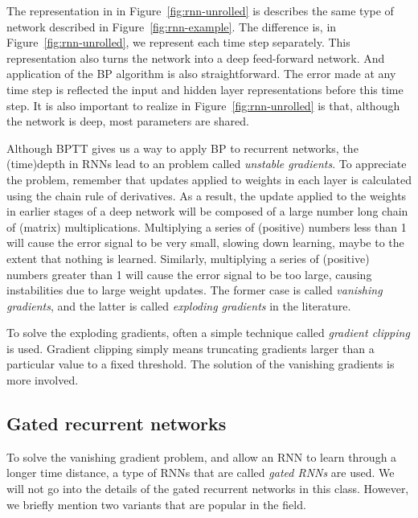 The representation in in Figure~\ref{fig:rnn-unrolled} is describes the
same type of network described in Figure~\ref{fig:rnn-example}.
The difference is, in Figure~\ref{fig:rnn-unrolled},
we represent each time step separately.
This representation also turns the network into a deep feed-forward network.
And application of the BP algorithm is also straightforward.
The error made at any time step is reflected the input and
hidden layer representations before this time step.
It is also important to realize in Figure~\ref{fig:rnn-unrolled} is that,
although the network is deep, most parameters are shared.

Although BPTT gives us a way to apply BP to recurrent networks,
the (time)depth in RNNs lead to an problem called \emph{unstable gradients}.
To appreciate the problem,
remember that updates applied to weights in each layer is 
calculated using the chain rule of derivatives.
As a result, 
the update applied to the weights in earlier stages of a deep network
will be composed of a large number long chain of (matrix) multiplications.
Multiplying a series of (positive) numbers less than \num{1}
will cause the error signal to be very small,
slowing down learning, maybe to the extent that nothing is learned.
Similarly, multiplying a series of (positive) numbers greater than \num{1}
will cause the error signal to be too large,
causing instabilities due to large weight updates.
The former case is called \emph{vanishing gradients},
and the latter is called \emph{exploding gradients} in the literature.

To solve the exploding gradients,
often a simple technique called \emph{gradient clipping} is used.
Gradient clipping simply means truncating gradients
larger than a particular value to a fixed threshold.
The solution of the vanishing gradients is more involved.

\subsection{Gated recurrent networks}
To solve the vanishing gradient problem,
and allow an RNN to learn through a longer time distance,
a type of RNNs that are called \emph{gated RNNs} are used.
We will not go into the details of the gated recurrent networks in this class.
However, we briefly mention two variants that are popular in the field.

